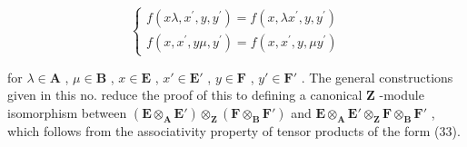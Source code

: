 \[
\left\{ \begin{array}{l} f (x \lambda , x ^ {\prime}, y, y ^ {\prime}) = f (x, \lambda x ^ {\prime}, y, y ^ {\prime}) \\ f (x, x ^ {\prime}, y \mu , y ^ {\prime}) = f (x, x ^ {\prime}, y, \mu y ^ {\prime}) \end{array} \right.\tag{38}
\]

for \(\lambda\in\mathbf{A}\) , \(\mu\in\mathbf{B}\) , \(x\in\mathbf{E}\) , \(x'\in\mathbf{E}'\) , \(y\in\mathbf{F}\) , \(y'\in\mathbf{F}'\) . The general constructions given in this no. reduce the proof of this to defining a canonical \(\mathbf{Z}\) -module isomorphism between \((\mathbf{E}\otimes_{\mathbf{A}}\mathbf{E}')\otimes_{\mathbf{Z}}(\mathbf{F}\otimes_{\mathbf{B}}\mathbf{F}')\) and \(\mathbf{E}\otimes_{\mathbf{A}}\mathbf{E}'\otimes_{\mathbf{Z}}\mathbf{F}\otimes_{\mathbf{B}}\mathbf{F}'\) , which follows from the associativity property of tensor products of the form (33).

